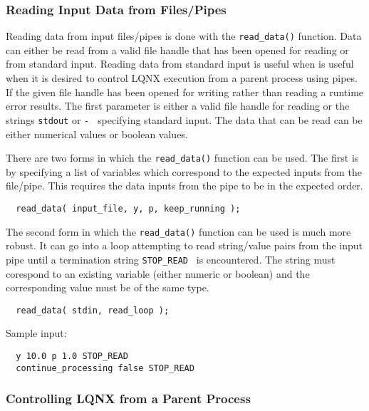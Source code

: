\subsubsection{Reading Input Data from Files/Pipes}

Reading data from input files/pipes is done with the {\tt read\_data()} function. Data can either be read from a valid
file handle that has been opened for reading or from standard input. Reading data from standard input is useful when
is useful when it is desired to control LQNX execution from a parent process using pipes.
If the given file handle has been opened for writing rather than reading a runtime error results. The first
parameter is either a valid file handle for reading or the strings {\tt stdout} or {\tt - } specifying
standard input. The data that can be read can be either numerical values or boolean values.

There are two forms in which the {\tt read\_data()} function can be used. The first is by specifying a list of
\ModLang variables which correspond to the expected inputs from the file/pipe. This requires the data inputs
from the pipe to be in the expected order.

\lstset{language=LQX}
\begin{lstlisting}
  read_data( input_file, y, p, keep_running );
\end{lstlisting}

The second form  in which the {\tt read\_data()} function can be used is much more robust. It can go into a loop
attempting to read string/value pairs from the input pipe until a termination string {\tt STOP\_READ } is encountered.
The string must corespond to an existing \ModLang variable (either numeric or boolean) and the corresponding
value must be of the same type.

\lstset{language=LQX}
\begin{lstlisting}
  read_data( stdin, read_loop );
\end{lstlisting}

Sample input:

\lstset{language=C++}
\begin{lstlisting}
  y 10.0 p 1.0 STOP_READ
  continue_processing false STOP_READ
\end{lstlisting}

\subsubsection{Controlling LQNX from a Parent Process}

